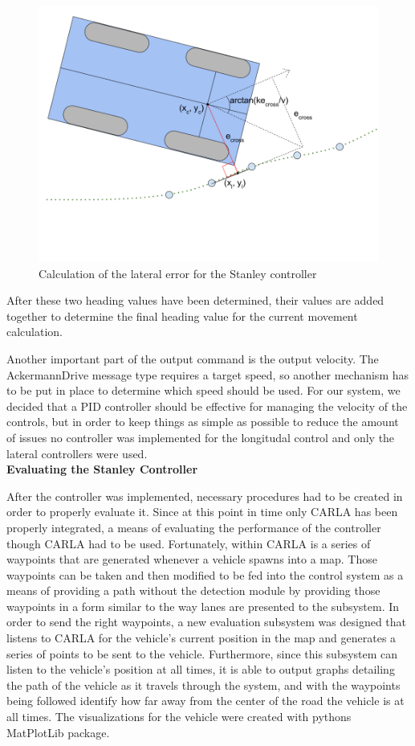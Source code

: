 \documentclass[titlepage, draft]{article}
\begin{document}
{\begin{figure}
	\centering
	\includegraphics[width=5in]{stanley_lateral_error}
	\caption{Calculation of the lateral error for the Stanley controller}
	\label{fig:stanley_lateral_calc}
\end{figure}

After these two heading values have been determined, their values are added together to determine the final heading value for the current movement calculation.

Another important part of the output command is the output velocity. The AckermannDrive message type requires a target speed, so another mechanism has to be put in place to determine which speed should be used. For our system, we decided that a PID controller should be effective for managing the velocity of the controls, but in order to keep things as simple as possible to reduce the amount of issues no controller was implemented for the longitudal control and only the lateral controllers were used.
\\

\textbf{Evaluating the Stanley Controller}

After the controller was implemented, necessary procedures had to be created in order to properly evaluate it. Since at this point in time only CARLA has been properly integrated, a means of evaluating the performance of the controller though CARLA had to be used. Fortunately, within CARLA is a series of waypoints that are generated whenever a vehicle spawns into a map. Those waypoints can be taken and then modified to be fed into the control system as a means of providing a path without the detection module by providing those waypoints in a form similar to the way lanes are presented to the subsystem. In order to send the right waypoints, a new evaluation subsystem was designed that listens to CARLA for the vehicle's current position in the map and generates a series of points to be sent to the vehicle. Furthermore, since this subsystem can listen to the vehicle's position at all times, it is able to output graphs detailing the path of the vehicle as it travels through the system, and with the waypoints being followed identify how far away from the center of the road the vehicle is at all times. The visualizations for the vehicle were created with pythons MatPlotLib package.

}
\end{document}
